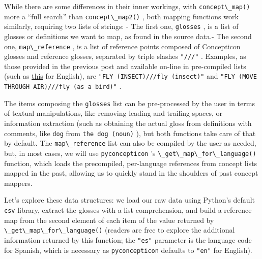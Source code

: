 \documentclass[
  a4paper,
  14pt,
  oneside,
  tablecaptionabove
]{scrbook}
\newcommand{\passthrough}[1]{#1}
\begin{document}
While there are some differences in their inner workings, with
\passthrough{\lstinline!concept\_map()!} more a \enquote{full search}
than \passthrough{\lstinline!concept\_map2()!} , both mapping functions
work similarly, requiring two lists of strings: - The first one,
\passthrough{\lstinline!glosses!} , is a list of glosses or definitions
we want to map, as found in the source data.- The second one,
\passthrough{\lstinline!map\_reference!} , is a list of reference points
composed of Concepticon glosses and reference glosses, separated by
triple slashes \passthrough{\lstinline!"///"!} . Examples, as those
provided in the previous post and available on-line in pre-compiled
lists (such as
\href{https://github.com/concepticon/pyconcepticon/blob/master/tests/fixtures/mappings/map-en.tsv}{this}
for English), are
\passthrough{\lstinline!"FLY (INSECT)///fly (insect)"!} and
\passthrough{\lstinline!"FLY (MOVE THROUGH AIR)///fly (as a bird)"!} .

The items composing the \passthrough{\lstinline!glosses!} list can be
pre-processed by the user in terms of textual manipulations, like
removing leading and trailing spaces, or information extraction (such as
obtaining the actual gloss from definitions with comments, like
\passthrough{\lstinline!dog!} from
\passthrough{\lstinline!the dog (noun)!} ), but both functions take care
of that by default. The \passthrough{\lstinline!map\_reference!} list
can also be compiled by the user as needed, but, in most cases, we will
use \passthrough{\lstinline!pyconcepticon!} 's
\passthrough{\lstinline!\_get\_map\_for\_language()!} function, which
loads the precompiled, per-language references from concept lists mapped
in the past, allowing us to quickly stand in the shoulders of past
concept mappers.

Let's explore these data structures: we load our raw data using Python's
default \passthrough{\lstinline!csv!} library, extract the glosses with
a list comprehension, and build a reference map from the second element
of each item of the value returned by
\passthrough{\lstinline!\_get\_map\_for\_language()!} (readers are free
to explore the additional information returned by this function; the
\passthrough{\lstinline!"es"!} parameter is the language code for
Spanish, which is necessary as \passthrough{\lstinline!pyconcepticon!}
defaults to \passthrough{\lstinline!"en"!} for English).
\end{document}
